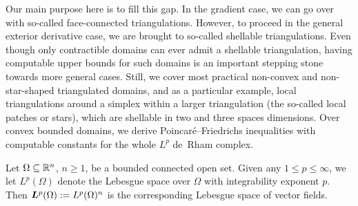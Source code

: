 \documentclass[10pt,a4paper]{article}
\newcommand\cye[1]{%
\protect\leavevmode
\begingroup
    \color{blue}%
    #1%
\endgroup
}
\begin{document}
\cye{Our main purpose here is to fill this gap. In the gradient case, we can go over with so-called face-connected triangulations. However, to proceed} in the \cye{general exterior derivative case, we are brought to} so-called shellable triangulations. 
Even though only contractible domains can ever admit a shellable triangulation, 
having computable upper bounds for such domains is an important stepping stone towards more general cases. \cye{Still, we cover most practical non-convex and non-star-shaped triangulated domains, and as a particular example, local triangulations} around a simplex within a larger triangulation \cye{(the so-called local patches or stars), which are} shellable in two and three spaces dimensions. \cye{Over convex bounded domains, we derive Poincar\'e--Friedrichs inequalities with computable constants for the whole $L^{p}$ de~Rham complex.}

Let $\Omega \subseteq {\mathbb R}^n$, $n \geq 1$, be a bounded connected open set. Given any $1 \leq p \leq \infty$, we let $L^{p}(\Omega)$ denote the Lebesgue space over $\Omega$ with integrability exponent $p$. Then $\bm{L}^{p}(\Omega) := L^{p}(\Omega)^{n}$ is the corresponding Lebesgue space of vector  fields. 


\end{document}
